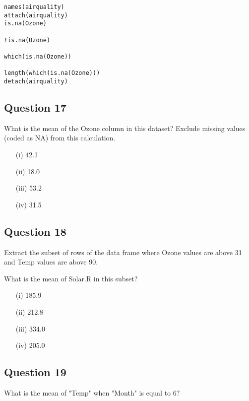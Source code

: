 \documentclass[12pt]{article}
\begin{document}
\begin{framed}
\begin{verbatim}
names(airquality)
attach(airquality)
is.na(Ozone)

!is.na(Ozone)

which(is.na(Ozone))

length(which(is.na(Ozone)))
detach(airquality)
\end{verbatim}
\end{framed}
\newpage
\subsection*{Question 17}
\Large
What is the mean of the Ozone column in this dataset? Exclude missing values (coded as NA) from this calculation.

\begin{itemize}
	\item[(i)] 42.1
	\item[(ii)] 18.0
	\item[(iii)] 53.2
	\item[(iv)] 31.5
\end{itemize}



\subsection*{Question 18}
\Large
Extract the subset of rows of the data frame where Ozone values are above 31 and Temp values are above 90. 

What is the mean of Solar.R in this subset?

\begin{itemize}
	\item[(i)] 185.9
	\item[(ii)] 212.8
	\item[(iii)] 334.0
	\item[(iv)] 205.0
\end{itemize}
\newpage
\subsection*{Question 19}
\Large
What is the mean of "Temp" when "Month" is equal to 6?
\end{document}
